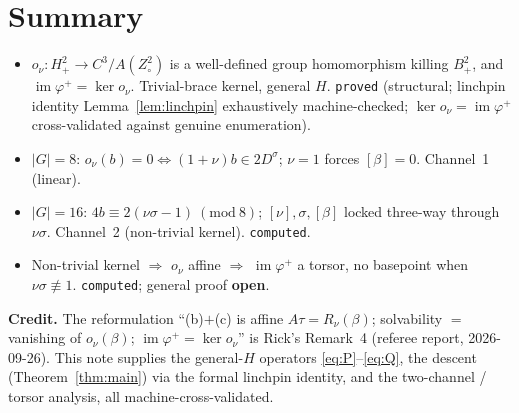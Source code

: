 \documentclass[11pt]{article}
\theoremstyle{definition}
\newcommand{\im}{\operatorname{im}}
\begin{document}
\section*{Summary}
\begin{itemize}\itemsep2pt
\item[\textbf{Thm~\ref{thm:main}}] $o_\nu:H^2_+\to C^3/A(Z^2_\circ)$ is a well-defined
group homomorphism killing $B^2_+$, and $\im\varphi^+=\ker o_\nu$. Trivial-brace kernel,
general $H$. \texttt{proved} (structural; linchpin identity Lemma~\ref{lem:linchpin}
exhaustively machine-checked; $\ker o_\nu=\im\varphi^+$ cross-validated against genuine
enumeration).
\item[\textbf{\S\ref{sec:g8}}] $|G|=8$: $o_\nu(b)=0\Leftrightarrow(1+\nu)b\in2D^\sigma$;
$\nu=1$ forces $[\beta]=0$. Channel~1 (linear).
\item[\textbf{\S\ref{sec:g16}}] $|G|=16$: $4b\equiv2(\nu\sigma-1)\ (\mathrm{mod}\ 8)$;
$[\nu],\sigma,[\beta]$ locked three-way through $\nu\sigma$. Channel~2 (non-trivial kernel).
\texttt{computed}.
\item[\textbf{\S\ref{sec:torsor}}] Non-trivial kernel $\Rightarrow$ $o_\nu$ affine
$\Rightarrow$ $\im\varphi^+$ a torsor, no basepoint when $\nu\sigma\not\equiv1$.
\texttt{computed}; general proof \textbf{open}.
\end{itemize}

\noindent\textbf{Credit.} The reformulation ``(b)$+$(c) is affine $A\tau=R_\nu(\beta)$;
solvability $=$ vanishing of $o_\nu(\beta)$; $\im\varphi^+=\ker o_\nu$'' is Rick's Remark~4
(referee report, 2026-09-26). This note supplies the general-$H$ operators
\eqref{eq:P}--\eqref{eq:Q}, the descent (Theorem~\ref{thm:main}) via the formal linchpin
identity, and the two-channel / torsor analysis, all machine-cross-validated.
\end{document}
